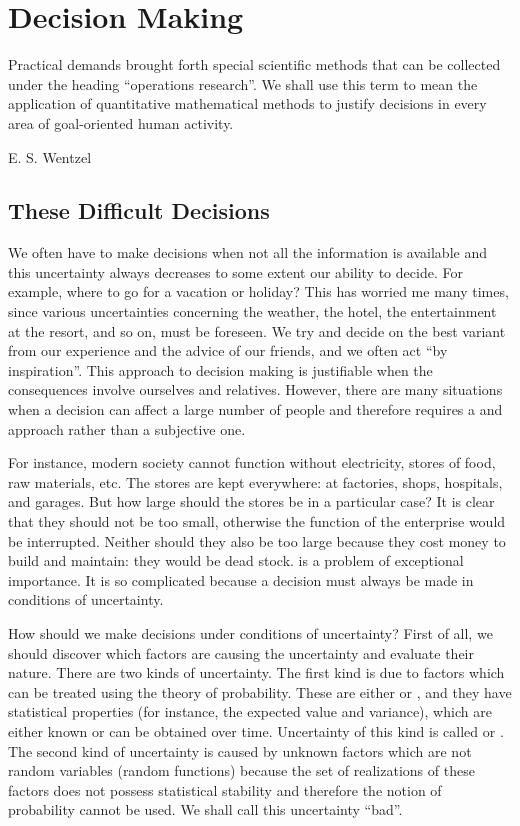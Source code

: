 \chapter{Decision Making}
\epigraph{Practical demands brought forth special scientific methods
  that can be collected under the heading ``operations research''. We
  shall use this term to mean the application of quantitative
  mathematical methods to justify decisions in every area of
  goal-oriented human activity.}  {E. S. Wentzel}

\section{These Difficult Decisions}

 We often have to make decisions when not all the information is
available and this uncertainty always decreases to some extent our
ability to decide. For example, where to go for a vacation or holiday?
This has worried me many times, since various uncertainties concerning
the weather, the hotel, the entertainment at the resort, and so on,
must be foreseen. We try and decide on the best variant from our
experience and the advice of our friends, and we often act ``by
inspiration''. This  approach to decision making is
justifiable when the consequences involve ourselves and
relatives. However, there are many situations when a decision can
affect a large number of people and therefore requires a 
and  approach rather than a
subjective one.


For instance, modern society cannot function without electricity,
stores of food, raw materials, etc. The stores are kept everywhere: at
factories, shops, hospitals, and garages. But how large should the
stores be in a particular case? It is clear that they should not be
too small, otherwise the function of the enterprise would be
interrupted. Neither should they also be too large because they cost
money to build and maintain: they would be dead stock.  is a problem of exceptional importance. It is so complicated because a decision must always be made in conditions of uncertainty.

 How should we make decisions under conditions of uncertainty? First of
all, we should discover which factors are causing the uncertainty and
evaluate their nature. There are two kinds of uncertainty. The ﬁrst
kind is due to factors which can be treated using the theory of
probability. These are either  or , and they have statistical properties (for instance, the
expected value and variance), which are either known or can be
obtained over time. Uncertainty of this kind is called
 or . The second kind of
uncertainty is caused by unknown factors which are not random
variables (random functions) because the set of realizations of these
factors does not possess statistical stability and therefore the
notion of probability cannot be used. We shall call this uncertainty
``bad''.

